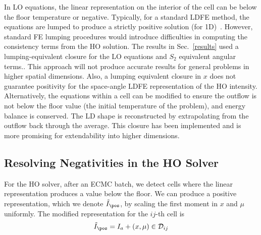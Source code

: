 In LO equations, the linear representation on the interior of the cell can be
below the floor temperature or negative.
Typically, for a standard LDFE method,
the equations are lumped to produce a strictly positive solution (for 1D)~\cite{morel_newton}. However, standard FE lumping
procedures would introduce difficulties in computing the consistency terms from the
HO solution.    The results in Sec.~\ref{results} used a lumping-equivalent closure for the LO equations and $S_2$ equivalent angular terms..
This approach will not produce
accurate results for general problems in higher spatial dimensions. Also, a lumping equivalent closure in $x$ does not guarantee positivity for the space-angle LDFE
representation of the HO intensity.
Alternatively, the equations within a cell can be modified to ensure the outflow is not
below the floor value (the initial temperature of the problem), and energy balance is
conserved.  The LD shape is reconstructed by extrapolating from the outflow back
through the average.  This closure has been implemented and is more promising for extendability into higher
dimensions.

\subsection{Resolving Negativities in the HO Solver}

For the HO solver, after an ECMC batch, we detect cells where the linear
representation produces a value below the floor.  We can produce a positive
representation, which we denote $\tilde I_{\text{\pos}}$, by scaling the first moment
in $x$ and $\mu$ uniformly.  The modified representation for the $ij$-th cell is
\begin{equation}
    \tilde I_{\pos} = I_{a} +       (x,\mu) \in \mathcal{D}_{ij}
\end{equation}


